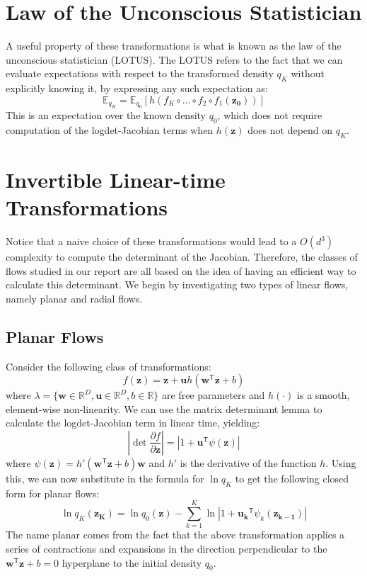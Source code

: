 \section{Law of the Unconscious Statistician}
A useful property of these transformations is what is known as the law of the unconscious statistician (LOTUS). The LOTUS refers to the fact that we can evaluate expectations with respect to the transformed density $q_K$ without explicitly knowing it, by expressing any such expectation as:
\begin{equation}
\mathbb{E}_{q_K} = \mathbb{E}_{q_0}[h(f_K \circ ... \circ f_2 \circ f_1(\mathbf{z_0}))]
\end{equation}
This is an expectation over the known density $q_0$, which does not require computation of the logdet-Jacobian terms when $h(\mathbf{z})$ does not depend on $q_K$.

\section{Invertible Linear-time Transformations}
Notice that a naive choice of these transformations would lead to a $O(d^3)$ complexity to compute the determinant of the Jacobian. Therefore, the classes of flows studied in our report are all based on the idea of having an efficient way to calculate this determinant. We begin by investigating two types of linear flows, namely planar and radial flows. 

\subsection{Planar Flows}
Consider the following class of transformations:
\begin{equation}
f(\mathbf{z}) = \mathbf{z}+\mathbf{u}h(\mathbf{w}^\mathsf{T}\mathbf{z}+b)
\end{equation}
where $\lambda = \{ \mathbf{w} \in \mathbb{R}^D, \mathbf{u} \in \mathbb{R}^D, b \in \mathbb{R} \}$ are free parameters and $h(\cdot)$ is a smooth, element-wise non-linearity. We can use the matrix determinant lemma to calculate the logdet-Jacobian term in linear time, yielding:
\begin{equation}
\left| \det \frac{\partial f}{\partial \mathbf{z}} \right| = \left| 1+\mathbf{u}^\mathsf{T}\psi(\mathbf{z})\right|
\end{equation}
where $\psi(\mathbf{z}) = h'(\mathbf{w}^\mathsf{T}\mathbf{z}+b)\mathbf{w}$ and $h'$ is the derivative of the function $h$. Using this, we can now substitute in the formula for $\ln q_K$ to get the following closed form for planar flows:
\begin{equation}
\ln q_K (\mathbf{z_K}) = \ln q_0(\mathbf{z}) - \sum_{k=1}^K \ln \left| 1+\mathbf{u_k}^\mathsf{T}\psi_k(\mathbf{z_{k-1}})\right|
\end{equation}
The name planar comes from the fact that the above transformation applies a series of contractions and expansions in the direction perpendicular to the $\mathbf{w}^\mathsf{T}\mathbf{z}+b = 0$ hyperplane to the initial density $q_0$.

